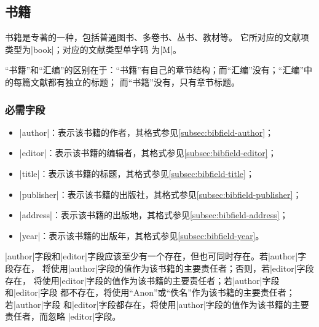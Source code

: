 
\subsection{书籍}\label{subsec:bibtype-book}

书籍是专著的一种，包括普通图书、多卷书、丛书、教材等\cite{gbt3469-1983,gbt7714-2005}。
它所对应的{\BibTeX}文献项类型为|book|；对应的文献类型单字码
为|M|\cite{gbt3469-1983}。

\begin{note}
“书籍”和“汇编”的区别在于：“书籍”有自己的章节结构；而“汇编”没有；“汇编”中的每篇文献都有独立的标题；
而“书籍”没有，只有章节标题。
\end{note}

\subsubsection{必需字段}

\begin{itemize}
\item |author|：表示该书籍的作者，其格式参见\ref{subsec:bibfield-author}；
\item |editor|：表示该书籍的编辑者，其格式参见\ref{subsec:bibfield-editor}；
\item |title|：表示该书籍的标题，其格式参见\ref{subsec:bibfield-title}；
\item |publisher|：表示该书籍的出版社，其格式参见\ref{subsec:bibfield-publisher}；
\item |address|：表示该书籍的出版地，其格式参见\ref{subsec:bibfield-address}；
\item |year|：表示该书籍的出版年，其格式参见\ref{subsec:bibfield-year}。
\end{itemize}

\begin{note}
|author|字段和|editor|字段应该至少有一个存在，但也可同时存在。若|author|字段存在，
{\BibTeX}将使用|author|字段的值作为该书籍的主要责任者；否则，若|editor|字段存在，
{\BibTeX}将使用|editor|字段的值作为该书籍的主要责任者；若|author|字段和|editor|字段
都不存在，{\BibTeX}将使用``Anon''或``佚名''作为该书籍的主要责任者；若|author|字段
和|editor|字段都存在，{\BibTeX}将使用|author|字段的值作为该书籍的主要责任者，而忽略
|editor|字段。
\end{note}

